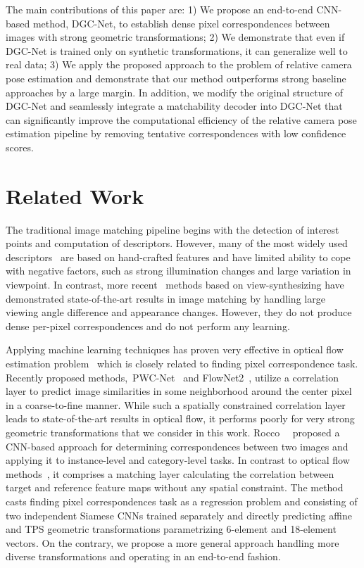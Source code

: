 \documentclass[10pt,twocolumn,letterpaper]{article}
\begin{document}
The main contributions of this paper are: 1) We propose an end-to-end CNN-based method, DGC-Net, to establish dense pixel correspondences between images with strong geometric transformations; 2) We demonstrate that even if DGC-Net is trained only on synthetic transformations, it can generalize well to real data; 3) We apply the proposed approach to the problem of relative camera pose estimation and demonstrate that our method outperforms strong baseline approaches by a large margin. In addition, we modify the original structure of DGC-Net and seamlessly integrate a matchability decoder into DGC-Net that can significantly improve the computational efficiency of the relative camera pose estimation pipeline by removing tentative correspondences with low confidence scores.

\vspace{-1mm}
\section{Related Work}
The traditional image matching pipeline begins with the detection of interest points and computation of descriptors. However, many of the most widely used descriptors~\cite{SURF,SIFT} are based on hand-crafted features and have limited ability to cope with negative factors, such as strong illumination changes and large variation in viewpoint. In contrast, more recent~\cite{MODS,ASIFT} methods based on view-synthesizing have demonstrated state-of-the-art results in image matching by handling large viewing angle difference and appearance changes. However, they do not produce dense per-pixel correspondences and do not perform any learning. 



Applying machine learning techniques has proven very effective in optical flow estimation problem~\cite{FlowNet2,Spynet,PWC-Net} which is closely related to finding pixel correspondence task. Recently proposed methods,~\ie PWC-Net~\cite{PWC-Net} and FlowNet2~\cite{FlowNet2}, utilize a correlation layer to predict image similarities in some neighborhood around the center pixel in a coarse-to-fine manner. While such a spatially constrained correlation layer leads to state-of-the-art results in optical flow, it performs poorly for very strong geometric transformations that we consider in this work. Rocco~\etal~\cite{Rocco17} proposed a CNN-based approach for determining correspondences between two images and applying it to instance-level and category-level tasks. In contrast to optical flow methods~\cite{FlowNet2,PWC-Net}, it comprises a matching layer calculating the correlation between target and reference feature maps without any spatial constraint. The method casts finding pixel correspondences task as a regression problem and consisting of two independent Siamese CNNs trained separately and directly predicting affine and TPS geometric transformations parametrizing 6-element and 18-element vectors. On the contrary, we propose a more general approach handling more diverse transformations and operating in an end-to-end fashion. 
\end{document}
